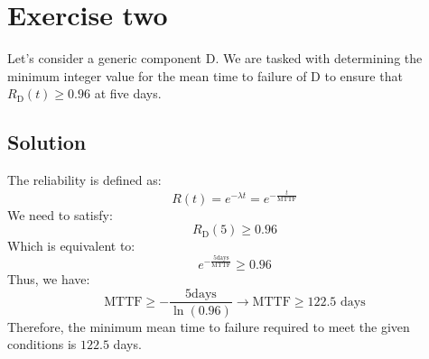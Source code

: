\section{Exercise two}

Let's consider a generic component D. 
We are tasked with determining the minimum integer value for the mean time to failure of D to ensure that $R_{\text{D}}(t) \geq 0.96$ at five days.

\subsection*{Solution}
The reliability is defined as:
\[R(t)=e^{-\lambda t}=e^{-\frac{t}{\text{MTTF}}}\]
We need to satisfy:
\[R_{\text{D}}(5)\geq 0.96\]
Which is equivalent to:
\[e^{-\frac{5 \text{days}}{\text{MTTF}}}\geq 0.96\]
Thus, we have:
\[\text{MTTF}\geq -\frac{5 \text{days}}{\ln(0.96)}\rightarrow \text{MTTF}\geq 122.5 \text{ days}\]
Therefore, the minimum mean time to failure required to meet the given conditions is $122.5$ days.